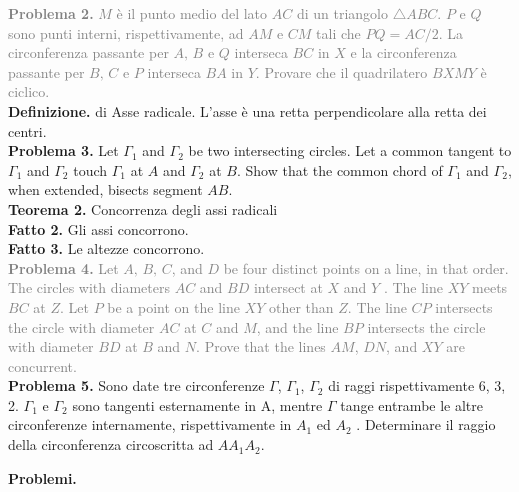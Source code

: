 \documentclass[a4paper]{article}
\theoremstyle{remark}
\theoremstyle{definition}
\begin{document}
\begin{multicols}{2}
	\textcolor{gray}{\textbf{Problema 2.} $ M $ è il punto medio del lato $ AC $ di un triangolo $ \bigtriangleup ABC $. $ P $ e $ Q $ sono punti interni, rispettivamente, ad $ AM $ e $ CM $ tali che $ PQ =  AC/2 $. La circonferenza passante per $ A,\,B $
	e $ Q $ interseca $ BC $ in $ X $ e la circonferenza passante per $ B,\,C $ e $ P $ interseca $ BA $ in
	$ Y $. Provare che il quadrilatero $ BXMY $ è ciclico.} \\

	\textbf{Definizione.} di Asse radicale. L'asse è una retta perpendicolare alla retta dei centri. \\
	
	\textbf{Problema 3.} Let $ \Gamma_1 $ and $ \Gamma_2 $ be two intersecting circles. Let a common tangent to $ \Gamma_1 $ and $ \Gamma_2 $ touch $ \Gamma_1 $
	at $ A $ and $ \Gamma_2 $ at $ B $. Show that the common chord of $ \Gamma_1 $ and $ \Gamma_2 $, when extended, bisects
	segment $ AB $. \\
	
	\textbf{Teorema 2.} Concorrenza degli assi radicali \\
	
	\textbf{Fatto 2.} Gli assi concorrono. \\
	
	\textbf{Fatto 3.} Le altezze concorrono. \\
	
	\textcolor{gray}{\textbf{Problema 4.} Let $ A,\, B,\, C $, and $ D $ be four distinct points on a line, in that order. The
	circles with diameters $ AC $ and $ BD $ intersect at $ X $ and $ Y $ . The line $ XY $ meets $ BC $ at $ Z $.
	Let $ P $ be a point on the line $ XY $ other than $ Z $. The line $ CP $ intersects the circle with
	diameter $ AC $ at $ C $ and $ M $, and the line $ BP $ intersects the circle with diameter $ BD $ at $ B $
	and $ N $. Prove that the lines $ AM $, $ DN $, and $ XY $ are concurrent.} \\
	
	\textbf{Problema 5.} Sono date tre circonferenze $ \Gamma $, $ \Gamma_1 $, $ \Gamma_2 $ di raggi rispettivamente 6, 3, 2. $ \Gamma_1 $ e $ \Gamma_2 $ sono tangenti
	esternamente in A, mentre $ \Gamma $ tange entrambe le altre circonferenze internamente, rispettivamente
	in $ A_1 $ ed $ A_2 $ . Determinare il raggio della circonferenza circoscritta ad $ AA_1A_2  $.
	
\end{multicols}


\newpage
\textbf{Problemi.}
\end{document}
